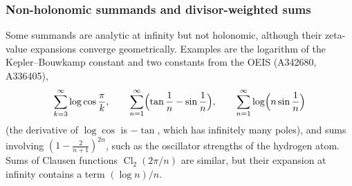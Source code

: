 \documentclass[11pt,reqno]{amsart}
\theoremstyle{definition}
\theoremstyle{remark}
\begin{document}
\subsubsection{Non-holonomic summands and divisor-weighted sums} Some summands are analytic at infinity but not
holonomic, although their zeta-value expansions converge geometrically. Examples are the logarithm of the
Kepler--Bouwkamp constant and two constants from the OEIS (A342680, A336405),
\[
  \sum_{k=3}^{\infty}\log\cos\frac\pi k, \qquad \sum_{n=1}^{\infty}\Bigl(\tan\frac1n - \sin\frac1n\Bigr), \qquad
  \sum_{n=1}^{\infty}\log\Bigl(n\sin\frac1n\Bigr)
\]
(the derivative of $\log\cos$ is $-\tan$, which has infinitely many poles), and sums involving
$(1 - \frac2{n+1})^{2n}$, such as the oscillator strengths of the hydrogen atom. Sums of Clausen functions
$\operatorname{Cl}_2(2\pi/n)$ are similar, but their expansion at infinity contains a term $(\log n)/n$.
\end{document}
